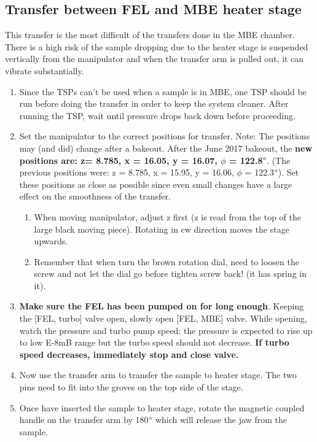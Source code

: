 \subsection{Transfer between FEL and MBE heater stage}
This transfer is the most difficult of the transfers done in the MBE chamber. There is a high risk of the sample dropping due to the heater stage is suspended vertically from the manipulator and when the transfer arm is pulled out, it can vibrate substantially.

\begin{enumerate}
	\item Since the TSPs can't be used when a sample is in MBE, one TSP should be run before doing the transfer in order to keep the system cleaner. After running the TSP, wait until pressure drops back down before proceeding.
	\item   Set the manipulator to the correct positions for transfer. Note: The positions may (and did) change after a bakeout.  After the June 2017 bakeout, the \textbf{new positions are:  z= 8.785, x =  16.05, y = 16.07, $\phi$ = 122.8$\degree$}. (The previous positions were: z = 8.785, x = 15.95, y = 16.06, $\phi$ = 122.3$\degree$). Set these positions as close as possible since even small changes have a large effect on the smoothness of the transfer.	
		\begin{enumerate}
			\item	When moving manipulator, adjust z first (z is read from the top of the large black moving piece).  Rotating in cw direction moves the stage upwards.
			\item	Remember that when turn the brown rotation dial, need to loosen the screw and not let the dial go before tighten screw back! (it has spring in it). 
		\end{enumerate}
	\item \textbf{Make sure the FEL has been pumped on for long enough}. Keeping the [FEL, turbo] valve open, slowly open [FEL, MBE] valve. While opening, watch the pressure and turbo pump speed: the pressure is expected to rise up to low E-8mB range but the turbo speed should not decrease. \textbf {If turbo speed decreases, immediately stop and close valve.}
	\item Now use the transfer arm to transfer the sample to heater stage. The two pins need to fit into the groves on the top side of the stage. 
	\item Once have inserted the sample to heater stage, rotate the magnetic coupled handle on the transfer arm by 180$\degree$ which will release the jaw from the sample. 

\end{enumerate}
